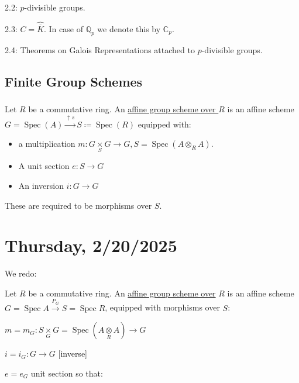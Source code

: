 \documentclass{article}
\theoremstyle{definition}
\numberwithin{theorem}{subsection}
\begin{document}
    2.2: \(p\)-divisible groups.

    2.3: \(C = \widehat{\overline{K}}\). In case of \(\mathbb{Q}_p\) we denote this by \(\mathbb{C}_p\).
    
    2.4: Theorems on Galois Representations attached to \(p\)-divisible groups.
   
    \subsection{Finite Group Schemes}

    \subsubsection{} Let \(R\) be a commutative ring. An \underline{affine group scheme over \(R\)} is an affine scheme \(G = \operatorname{Spec}(A) \xrightarrow{\uparrow s} S \coloneqq \operatorname{Spec}(R)\) equipped with:

    \begin{itemize}
        \item a multiplication \(m: G \underset{S}{\times} G \to G, S = \operatorname{Spec}(A \otimes_R A)\).
        \item A unit section \(e: S \to G\)
        \item An inversion \(i: G \to G\)    
    \end{itemize} 

    These are required to be morphisms over \(S\).

    \section*{Thursday, 2/20/2025}
    
    We redo:

    Let \(R\) be a commutative ring. An \underline{affine group scheme over} \(R\) is an affine scheme \(G = \operatorname{Spec} A \xrightarrow{P_G} S = \operatorname{Spec} R\), equipped with morphisms over \(S\):

    \(m = m_G: S \underset{G}{\times} G = \operatorname{Spec} (A \underset{R}{\otimes} A) \to G\)
    
    \(i = i_G: G \to G\) [inverse]

    \(e = e_G\) unit section so that:

    \begin{center}
    \end{center}
\end{document}
